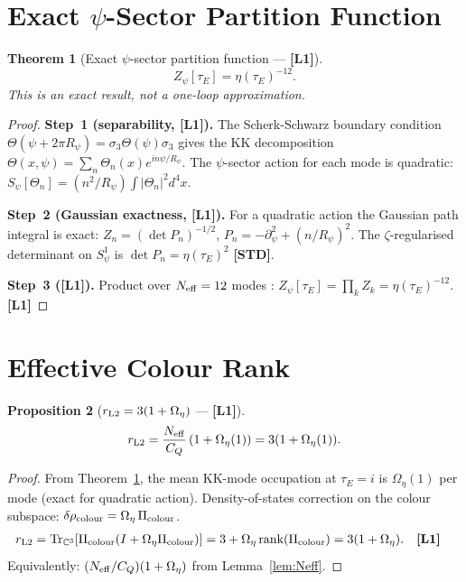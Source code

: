 \documentclass[12pt,a4paper]{article}
\newtheorem{theorem}{Theorem}[section]
\newtheorem{proposition}[theorem]{Proposition}
\theoremstyle{definition}\newtheorem{definition}[theorem]{Definition}
\theoremstyle{remark}\newtheorem{remark}[theorem]{Remark}
\newcommand{\Lo}{\textbf{[L1]}}
\newcommand{\STD}{\textbf{[STD]}}
\begin{document}
\section{Exact $\psi$-Sector Partition Function}
\label{sec:Zpsi}

\begin{theorem}[Exact $\psi$-sector partition function --- \Lo]
\label{thm:Zpsi}
\[
  Z_\psi[\tau_E] = \eta(\tau_E)^{-12}.
\]
This is an exact result, not a one-loop approximation.
\end{theorem}
\begin{proof}
\textbf{Step~1 (separability, \Lo).}
The Scherk-Schwarz boundary condition
$\Theta(\psi+2\pi R_\psi)=\sigma_3\Theta(\psi)\sigma_3$
\cite{su2twist} gives the KK decomposition
$\Theta(x,\psi)=\sum_n\Theta_n(x)e^{in\psi/R_\psi}$.
The $\psi$-sector action for each mode is quadratic:
$S_\psi[\Theta_n]=(n^2/R_\psi)\int|\Theta_n|^2d^4x$.

\textbf{Step~2 (Gaussian exactness, \Lo).}
For a quadratic action the Gaussian path integral is exact:
$Z_n=(\det P_n)^{-1/2}$, $P_n=-\partial_\psi^2+(n/R_\psi)^2$.
The $\zeta$-regularised determinant on $S^1_\psi$ is
$\det P_n = \eta(\tau_E)^2$ \STD.

\textbf{Step~3 (\Lo).}
Product over $N_{\rm eff}=12$ modes \cite{su2twist}:
$Z_\psi[\tau_E]=\prod_k Z_k = \eta(\tau_E)^{-12}$. \Lo
\end{proof}

\section{Effective Colour Rank}
\label{sec:rL2}

\begin{proposition}[$r_{\rm L2}=3(1+\Omega_\eta)$ --- \Lo]
\label{prop:rL2}
\[
  r_{\rm L2}
  = \frac{N_{\rm eff}}{C_Q}\,(1+\Omega_\eta(1))
  = 3(1+\Omega_\eta(1)).
\]
\end{proposition}
\begin{proof}
From Theorem~\ref{thm:Zpsi}, the mean KK-mode occupation at
$\tau_E=i$ is $\Omega_\eta(1)$ per mode (exact for quadratic action).
Density-of-states correction on the colour subspace:
$\delta\rho_{\rm colour}=\Omega_\eta\,\Pi_{\rm colour}$.
\begin{align*}
  r_{\rm L2}
  &=\mathrm{Tr}_{\mathbb{C}^3}[\Pi_{\rm colour}(I+\Omega_\eta\Pi_{\rm colour})]
   =3+\Omega_\eta\,\mathrm{rank}(\Pi_{\rm colour})
   =3(1+\Omega_\eta). \quad\Lo
\end{align*}
Equivalently: $(N_{\rm eff}/C_Q)(1+\Omega_\eta)$ from Lemma~\ref{lem:Neff}.
\end{proof}
\end{document}
